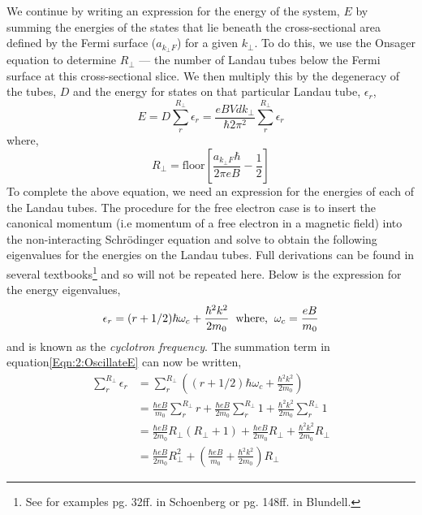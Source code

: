 We continue by writing an expression for the energy of the system, $E$ by summing the energies of the states that lie beneath the cross-sectional area defined by the Fermi surface ($a_{k_\perp F}$) for a given $k_\perp$. To do this, we use the Onsager equation to determine $R_\perp$ --- the number of Landau tubes below the Fermi surface at this cross-sectional slice. We then multiply this by the degeneracy of the tubes, $D$ and the energy for states on that particular Landau tube, $\epsilon_r$,
\begin{equation}
\label{Eqn:2:OscillateE}
E = D\sum_{r}^{R_\perp}\epsilon_r = \frac{eBVdk_\perp}{\hbar 2 \pi^2}\sum_{r}^{R_\perp}\epsilon_r
\end{equation}
 where,
\begin{equation}
R_\perp = \textrm{floor}\left[\frac{a_{k_\perp F}\hbar}{2\pi e B} - \frac{1}{2}\right]
\end{equation}
To complete the above equation, we need an expression for the energies of each of the Landau tubes. The procedure for the free electron case is to insert the canonical momentum (i.e momentum of a free electron in a magnetic field) into the non-interacting Schr\"odinger equation and solve to obtain the following eigenvalues for the energies on the Landau tubes. Full derivations can be found in several textbooks\footnote{See for examples pg. 32ff. in Schoenberg\cite{Schoenberg1984} or pg. 148ff. in Blundell\cite{Blundell2001}.} and so will  not be repeated here. Below is the expression for the energy eigenvalues,
\begin{equation}
\epsilon_r=(r+1/2) \hbar \omega_c + \frac{\hbar^2 k^2}{2m_0} \textrm{\hspace{0.2cm}where,\hspace{0.2cm}} \omega_c = \frac{eB}{m_0}
\end{equation}
and is known as the \textit{cyclotron frequency}. The summation term in equation\ref{Eqn:2:OscillateE} can now be written,
\begin{align*}
\sum_r^{R_\perp}\epsilon_r &= \sum_r^{R_\perp}\left( (r+1/2) \hbar \omega_c + \frac{\hbar^2 k^2}{2m_0} \right) \\
    &= \frac{\hbar eB}{m_0}\sum_r^{R_\perp}r + \frac{\hbar eB}{2m_0}\sum_r^{R_\perp}1 + \frac{\hbar^2 k^2}{2m_0}\sum_r^{R_\perp}1 \\
    &= \frac{\hbar eB}{2 m_0} R_\perp(R_\perp + 1) + \frac{\hbar eB}{2m_0}R_\perp + \frac{\hbar^2 k^2}{2m_0}R_\perp \\
    &= \frac{\hbar eB}{2m_0}R_\perp^2 + \left(\frac{\hbar eB}{m_0} + \frac{\hbar^2 k^2}{2m_0}\right)R_\perp
\end{align*}
